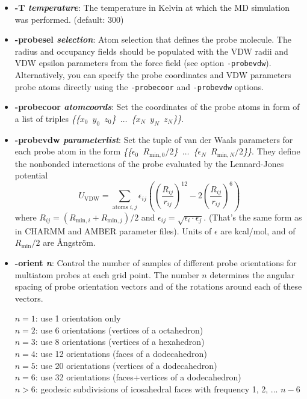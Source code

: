 \begin{itemize}
  \item {\bf -T {\it temperature}}: The temperature in Kelvin at which the
    MD simulation was performed. (default: 300)

  \item {\bf -probesel {\it selection}}: Atom selection that defines the
    probe molecule. The radius and occupancy fields should be populated
    with the VDW radii and VDW epsilon parameters from the force field
    (see option {\tt -probevdw}).
    Alternatively, you can specify the probe coordinates and VDW parameters
    probe atoms directly using the {\tt -probecoor} and {\tt -probevdw}
    options. 

  \item {\bf -probecoor {\it atomcoords}}: Set the coordinates of the
    probe atoms in form of a list of triples
    {\it \{\{$x_0$~$y_0$~$z_0$\}~$\dots$~\{$x_N$~$y_N$~$z_N$\}\}}. 

    
  \item {\bf -probevdw {\it parameterlist}}: Set the tuple of van der
    Waals parameters for each probe atom in the form
    {\it
    \{\{$\epsilon_0$~$R_{\mathrm{min},0}/2$\}~$\dots$~\{$\epsilon_N$~$R_{\mathrm{min},N}/2$\}\}}.
    They define the nonbonded interactions of the probe evaluated by the
    Lennard-Jones potential 
    \begin{equation}
      \label{eq:vdw}
      U_\mathrm{VDW} = \sum_{\mathrm{atoms}\,\,i,j}
         \epsilon_{ij}\left(\left(\frac{R_{ij}}{r_{ij}}\right)^{12} - 
         2\left(\frac{R_{ij}}{r_{ij}}\right)^{6}\right)
    \end{equation}
    where $R_{ij}=(R_{\mathrm{min},i}+R_{\mathrm{min},j})/2$ and
    $\epsilon_{ij}=\sqrt{\epsilon_i\cdot\epsilon_j}$.
    (That's the same form as in CHARMM and AMBER parameter files).
    Units of $\epsilon$ are kcal/mol, and of $R_\mathrm{min}/2$ are
    {\AA}ngstr\"om.  

  \item {\bf -orient {\it n}}: Control the number of samples of
    different probe orientations for multiatom probes at each grid
    point. The number $n$ determines the angular spacing of probe
    orientation vectors and of the rotations around each of these
    vectors.

    $n=1$: use 1 orientation only\\
    $n=2$: use 6 orientations (vertices of a octahedron)\\
    $n=3$: use 8 orientations (vertices of a hexahedron)\\
    $n=4$: use 12 orientations (faces of a dodecahedron)\\
    $n=5$: use 20 orientations (vertices of a dodecahedron)\\
    $n=6$: use 32 orientations (faces+vertices of a dodecahedron)\\
    $n>6$: geodesic subdivisions of icosahedral faces
           with frequency 1, 2, ... $n-6$
    

\end{itemize}
